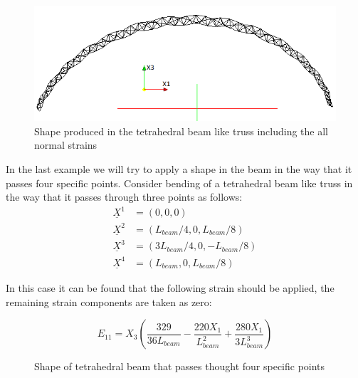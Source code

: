 \begin{figure} 
\centering
\includegraphics[width=5.0in]{./chap_5_active_trusses/images_linear_tetrahedral/tetra_hedral_arc_2_pi_shape_with_pressure.png}
\caption{Shape produced in the tetrahedral beam like truss including the all normal strains}
\label{fig:tetra_hedral_arc_2_pi_shape_with_pressure}
\end{figure} 

In the last example we will try to apply a shape in the beam in the way that it passes four specific points. Consider bending of a tetrahedral beam like truss in the way that it passes through three points as follows: 
\begin{equation}
\begin{aligned}
\underline X ^1&=(0,0,0) \\
\underline X ^2&=(L_{beam}/4,0,L_{beam}/8) \\
\underline X ^3&=(3 L_{beam}/4,0,-L_{beam}/8) \\
\underline X ^4&=(L_{beam},0,L_{beam}/8)
\end{aligned}
\label{three_points:eqn}
\end{equation}

In this case it can be found that the following strain should be applied, the remaining strain components are taken as zero: 

\begin{equation}
E_{11}=X_3 \left(
\frac{329}{36L_{beam}} -
\frac{220 X_1}{L_{beam}^2} +
\frac{280 X_1}{ 3 L_{beam}^3}  \right)
\label{three_points_strain:eqn}
\end{equation}


\begin{figure}
\centering
{}
\caption{Shape of tetrahedral beam that passes thought four specific points}
\label{fig:tetra_hedral_three_point}
\end{figure}

